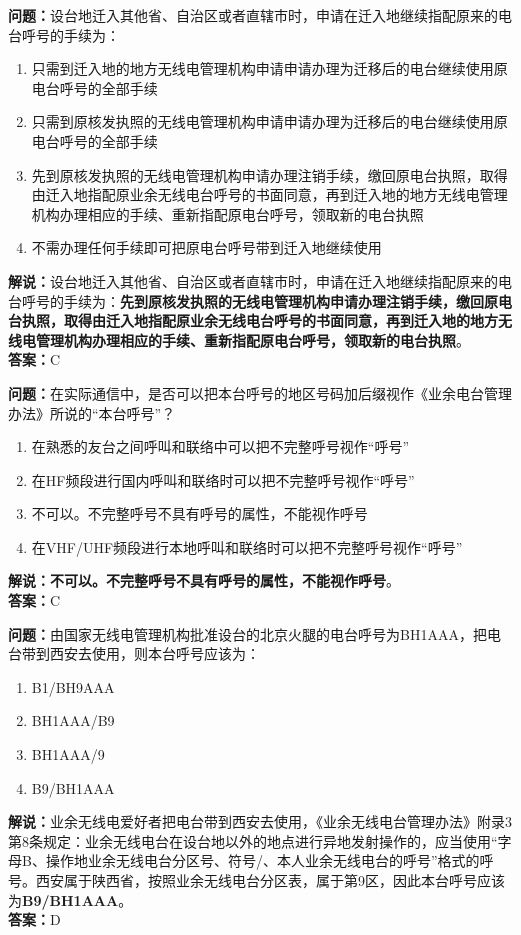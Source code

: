 \bigskip


\noindent\textbf{问题：}设台地迁入其他省、自治区或者直辖市时，申请在迁入地继续指配原来的电台呼号的手续为：
\begin{enumerate}[label=\Alph*), leftmargin=3em]
	\item 只需到迁入地的地方无线电管理机构申请申请办理为迁移后的电台继续使用原电台呼号的全部手续
	\item 只需到原核发执照的无线电管理机构申请申请办理为迁移后的电台继续使用原电台呼号的全部手续
	\item 先到原核发执照的无线电管理机构申请办理注销手续，缴回原电台执照，取得由迁入地指配原业余无线电台呼号的书面同意，再到迁入地的地方无线电管理机构办理相应的手续、重新指配原电台呼号，领取新的电台执照
	\item 不需办理任何手续即可把原电台呼号带到迁入地继续使用
\end{enumerate}
\noindent\textbf{解说：}设台地迁入其他省、自治区或者直辖市时，申请在迁入地继续指配原来的电台呼号的手续为：\textbf{先到原核发执照的无线电管理机构申请办理注销手续，缴回原电台执照，取得由迁入地指配原业余无线电台呼号的书面同意，再到迁入地的地方无线电管理机构办理相应的手续、重新指配原电台呼号，领取新的电台执照}。\\\noindent\textbf{答案：}C




\bigskip


\noindent\textbf{问题：}在实际通信中，是否可以把本台呼号的地区号码加后缀视作《业余电台管理办法》所说的“本台呼号”？
\begin{enumerate}[label=\Alph*), leftmargin=3em]
	\item 在熟悉的友台之间呼叫和联络中可以把不完整呼号视作“呼号”
	\item 在HF频段进行国内呼叫和联络时可以把不完整呼号视作“呼号”
	\item 不可以。不完整呼号不具有呼号的属性，不能视作呼号
	\item 在VHF/UHF频段进行本地呼叫和联络时可以把不完整呼号视作“呼号”
\end{enumerate}
\textbf{解说：不可以。不完整呼号不具有呼号的属性，不能视作呼号}。\\\noindent\textbf{答案：}C


\bigskip


\noindent\textbf{问题：}由国家无线电管理机构批准设台的北京火腿的电台呼号为BH1AAA，把电台带到西安去使用，则本台呼号应该为：
\begin{enumerate}[label=\Alph*), leftmargin=3em]
	\item B1/BH9AAA
	\item BH1AAA/B9
	\item BH1AAA/9
	\item B9/BH1AAA
\end{enumerate}
\noindent\textbf{解说：}业余无线电爱好者把电台带到西安去使用，《业余无线电台管理办法》附录3第8条规定：业余无线电台在设台地以外的地点进行异地发射操作的，应当使用“字母B、操作地业余无线电台分区号、符号/、本人业余无线电台的呼号”格式的呼号。西安属于陕西省，按照业余无线电台分区表，属于第9区，因此本台呼号应该为\textbf{B9/BH1AAA}。\\\noindent\textbf{答案：}D



